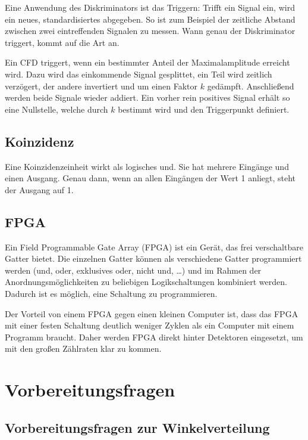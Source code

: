 \documentclass[11pt, ngerman, fleqn, DIV=15, headinclude, BCOR=2cm]{scrreprt}
\begin{document}
Eine Anwendung des Diskriminators ist das Triggern: Trifft ein Signal ein, wird
ein neues, standardisiertes abgegeben. So ist zum Beispiel der zeitliche
Abstand zwischen zwei eintreffenden Signalen zu messen. Wann genau der
Diskriminator triggert, kommt auf die Art an.

Ein CFD triggert, wenn ein bestimmter Anteil der Maximalamplitude erreicht
wird. Dazu wird das einkommende Signal gesplittet, ein Teil wird zeitlich
verzögert, der andere invertiert und um einen Faktor $k$ gedämpft. Anschließend
werden beide Signale wieder addiert. Ein vorher rein positives Signal erhält so
eine Nullstelle, welche durch $k$ bestimmt wird und den Triggerpunkt definiert.

\parencite{Ueding/525}

\subsection{Koinzidenz}

Eine Koinzidenzeinheit wirkt als logisches und. Sie hat mehrere Eingänge und
einen Ausgang. Genau dann, wenn an allen Eingängen der Wert 1 anliegt, steht
der Ausgang auf 1.

\subsection{FPGA}

Ein Field Programmable Gate Array (FPGA) ist ein Gerät, das frei verschaltbare
Gatter bietet. Die einzelnen Gatter können als verschiedene Gatter programmiert
werden (und, oder, exklusives oder, nicht und, …) und im Rahmen der
Anordnungsmöglichkeiten zu beliebigen Logikschaltungen kombiniert werden.
Dadurch ist es möglich, eine Schaltung zu programmieren.

Der Vorteil von einem FPGA gegen einen kleinen Computer ist, dass das FPGA mit
einer festen Schaltung deutlich weniger Zyklen als ein Computer mit einem
Programm braucht. Daher werden FPGA direkt hinter Detektoren eingesetzt, um mit
den großen Zählraten klar zu kommen.

\section{Vorbereitungsfragen}

\subsection{Vorbereitungsfragen zur Winkelverteilung}
\end{document}
